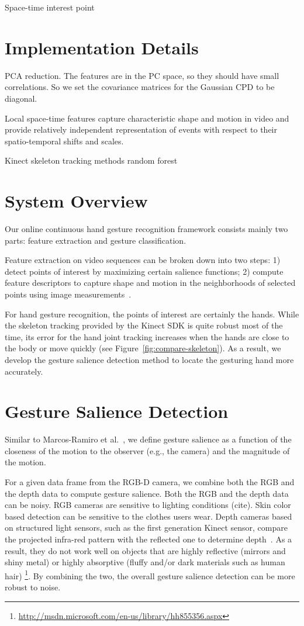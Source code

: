 \documentclass{sigchi}
\begin{document}
Space-time interest point
\section{Implementation Details}
PCA reduction. The features are in the PC space, so they should have small correlations.
So we set the covariance matrices for the Gaussian CPD to be diagonal.


Local space-time features capture characteristic shape and motion in video and
provide relatively independent representation of events with respect to their
spatio-temporal shifts and scales. \cite{wang-spatio-2009}


\cite{wang-spatio-2009}

Kinect skeleton tracking methods random forest

\section{System Overview}
Our online continuous hand gesture recognition framework consists mainly two parts: feature
extraction and gesture classification.

Feature extraction on video sequences can be broken down into two steps: 1)
detect points of interest by maximizing certain salience functions; 2) compute
feature descriptors to capture shape and motion in the neighborhoods of selected
points using image measurements~\cite{wang-spatio-2009}.

For hand gesture recognition, the points of interest are certainly the hands. While the skeleton tracking provided
by the Kinect SDK is quite robust most of the time, its error for the hand joint tracking increases when
the hands are close to the body or move quickly (see Figure~\ref{fig:compare-skeleton}). As a result, we
develop the gesture salience detection method to locate the gesturing hand more accurately.
 
\section{Gesture Salience Detection}

Similar to Marcos-Ramiro et al.~\cite{marcos2013}, we define gesture salience as a function of 
the closeness of the motion to the observer (e.g., the camera) and the magnitude of the motion.

For a given data frame from the RGB-D camera, we combine both the RGB and the depth data to 
compute gesture salience. Both the RGB and the depth data can be noisy. RGB cameras are sensitive to lighting conditions (cite).
Skin color based detection can be sensitive to the clothes users wear. Depth cameras based on 
structured light sensors, such as the first generation Kinect sensor, compare the projected infra-red pattern
with the reflected one to determine depth~\cite{welsh:2011}. As a result, they do not work well on 
objects that are highly reflective (mirrors and shiny metal) or highly absorptive (fluffy and/or dark materials such as human hair)
\footnote{\url{http://msdn.microsoft.com/en-us/library/hh855356.aspx}}. By combining the two,
the overall gesture salience detection can be more robust to noise.
\end{document}

